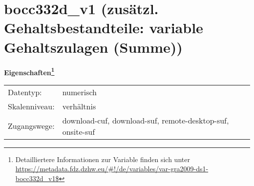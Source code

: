 
    \setcounter{footnote}{0}

    \vspace*{-1.8cm}
	\section{bocc332d\_v1 (zusätzl. Gehaltsbestandteile: variable Gehaltszulagen (Summe))}
	\label{section:bocc332d_v1}



    \vspace*{0.5cm}
    \noindent\textbf{Eigenschaften\footnote{Detailliertere Informationen zur Variable finden sich unter
		\url{https://metadata.fdz.dzhw.eu/\#!/de/variables/var-gra2009-ds1-bocc332d_v1$}}}\\
	\begin{tabularx}{\hsize}{@{}lX}
	Datentyp: & numerisch \\
	Skalenniveau: & verhältnis \\
	Zugangswege: &
	  download-cuf, 
	  download-suf, 
	  remote-desktop-suf, 
	  onsite-suf
 \\
    \end{tabularx}



